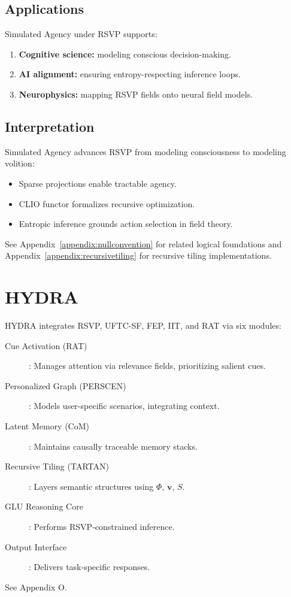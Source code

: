 \documentclass[12pt]{report}
\newcommand{\PhiRSVP}{\Phi}
\newcommand{\vRSVP}{\mathbf{v}}
\newcommand{\SRSVP}{S}
\begin{document}
\section{Applications}

Simulated Agency under RSVP supports:
\begin{enumerate}
    \item \textbf{Cognitive science:} modeling conscious decision-making.  
    \item \textbf{AI alignment:} ensuring entropy-respecting inference loops.  
    \item \textbf{Neurophysics:} mapping RSVP fields onto neural field models.  
\end{enumerate}

\section{Interpretation}

Simulated Agency advances RSVP from modeling consciousness to modeling volition:
\begin{itemize}
    \item Sparse projections enable tractable agency.  
    \item CLIO functor formalizes recursive optimization.  
    \item Entropic inference grounds action selection in field theory.  
\end{itemize}

See Appendix~\ref{appendix:nullconvention} for related logical foundations and Appendix~\ref{appendix:recursivetiling} for recursive tiling implementations.


\chapter{HYDRA}
HYDRA integrates RSVP, UFTC-SF, FEP, IIT, and RAT via six modules:
\begin{description}
    \item[Cue Activation (RAT)]: Manages attention via relevance fields, prioritizing salient cues.
    \item[Personalized Graph (PERSCEN)]: Models user-specific scenarios, integrating context.
    \item[Latent Memory (CoM)]: Maintains causally traceable memory stacks.
    \item[Recursive Tiling (TARTAN)]: Layers semantic structures using \(\PhiRSVP\), \(\vRSVP\), \(\SRSVP\).
    \item[GLU Reasoning Core]: Performs RSVP-constrained inference.
    \item[Output Interface]: Delivers task-specific responses.
\end{description}
See Appendix O.
\end{document}
